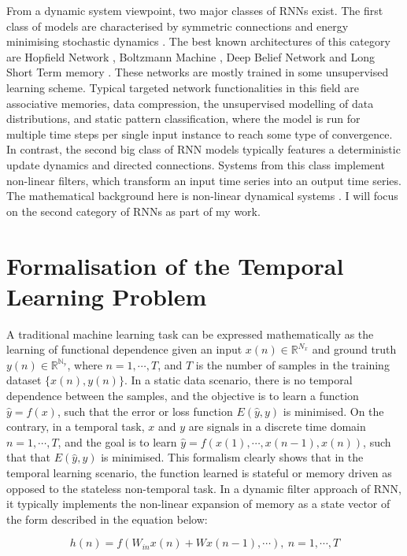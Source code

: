 From a dynamic system viewpoint, two major classes of RNNs exist. The first class of models are characterised by symmetric connections and energy minimising stochastic dynamics \citep{lukovsevivcius2009reservoir}. The best known architectures of this category are Hopfield Network \citep{hopfield1982neural}, Boltzmann Machine \citep{hinton1986learning}, Deep Belief Network \citep{bengio2007greedy} and Long Short Term memory \citep{hochreiter1997long}. These networks are mostly trained in some unsupervised learning scheme. Typical targeted network functionalities in this field are associative memories, data compression, the unsupervised modelling of data distributions, and static pattern classification, where the model is run for multiple time steps per single input instance to reach some type of convergence. In contrast, the second big class of RNN models typically features a deterministic update dynamics and directed connections. Systems from this class implement non-linear filters, which transform an input time series into an output time series. The mathematical background here is non-linear dynamical systems \citep{lukovsevivcius2009reservoir}. I will focus on the second category of RNNs as part of my work.

\section{Formalisation of the Temporal Learning Problem}
A traditional machine learning task can be expressed mathematically as the learning of functional dependence given an input $x(n)\in \mathbb{R}^{N_x}$ and ground truth $y(n) \in \mathbb{R^{N_y}}$, where $n=1,\cdots, T$, and $T$ is the number of samples in the training dataset $\{x(n), y(n)\}$. In a static data scenario, there is no temporal dependence between the samples, and the objective is to learn a function $\hat{y}= f(x)$, such that the error or loss function $E(\hat{y}, y)$ is minimised. On the contrary, in a temporal task, $x$ and $y$ are signals in a discrete time domain $n=1,\cdots, T$, and the goal is to learn $\hat{y}=f(x(1),\cdots,x(n-1), x(n))$, such that that $E(\hat{y}, y)$ is minimised. This formalism clearly shows that in the temporal learning scenario, the function learned is stateful or memory driven as opposed to the stateless non-temporal task. In a dynamic filter approach of RNN, it typically implements the non-linear expansion of memory as a state vector of the form described in the equation below:

\begin{equation}
	h(n)=f(W_{in}x(n)+Wx(n-1),\cdots), \ n=1, \cdots, T
\end{equation}

